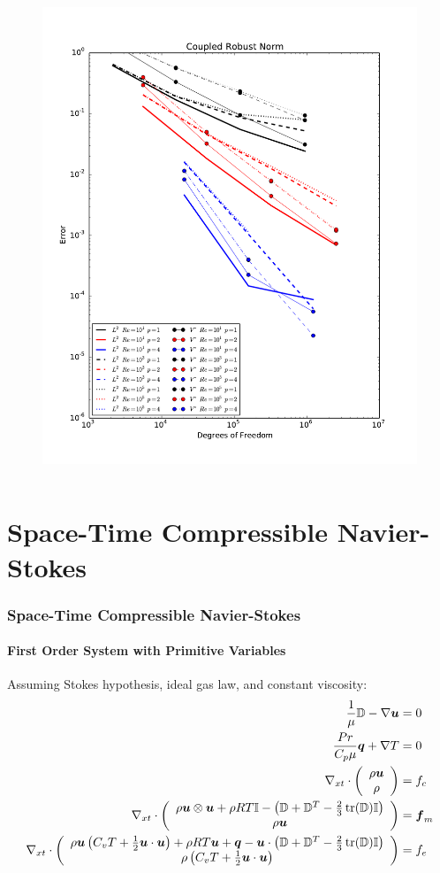 \documentclass[18pt,xcolor=table]{beamer}
\begin{document}
\begin{frame}[t]
\begin{columns}
\begin{column}{0.6\textwidth}
\begin{figure}
\includegraphics[width=\textwidth]{Incompressible/TaylorGreen/coupledrobust_convergence.pdf}
\end{figure}
\end{column}
\end{columns}
\end{frame}



\section{Space-Time Compressible Navier-Stokes}
\begin{frame}[t]
\frametitle{Space-Time Compressible Navier-Stokes}
\framesubtitle{First Order System with Primitive Variables}
Assuming Stokes hypothesis, ideal gas law, and constant viscosity:
\begin{align*}
  \frac{1}{\mu}\mathbb{D}-\nabla\boldsymbol u&=0\\
  \frac{Pr}{C_p\mu}\boldsymbol q+\nabla T&=0\\
  \nabla_{xt}\cdot\left( \begin{array}{c} \rho\boldsymbol u\\ \rho\\ \end{array} \right)&=f_c\\
  \nabla_{xt}\cdot\left( \begin{array}{c} \rho\boldsymbol u\otimes\boldsymbol u+\rho RT\mathbb{I}-\left( \mathbb{D}+\mathbb{D}^T-\frac{2}{3}\operatorname*{tr}(\mathbb{D})\mathbb{I} \right)\\ \rho\boldsymbol u\\ \end{array} \right)&=\boldsymbol f_m\\
  \nabla_{xt}\cdot\left( \begin{array}{c} \rho\boldsymbol u\left( C_v T+\frac{1}{2}\boldsymbol u\cdot\boldsymbol u \right)+\rho RT\boldsymbol u+\boldsymbol q-\boldsymbol u\cdot\left( \mathbb{D}+\mathbb{D}^T-\frac{2}{3}\operatorname*{tr}(\mathbb{D})\mathbb{I} \right)\\ \rho\left( C_v T+\frac{1}{2}\boldsymbol u\cdot\boldsymbol u \right)\\ \end{array} \right)&=f_e
\end{align*}
\end{frame}
\end{document}
